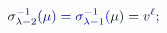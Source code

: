 \documentclass[12pt]{article}
\begin{document}
\makeatletter
\renewcommand*{\@textcolor}[3]{%
  \protect\leavevmode
  \begingroup
    \color#1{#2}#3%
  \endgroup
}
\makeatother
\begin{displaymath}
\mathcolor[RGB]{0,0,15}{\sigma} _ { \mathcolor[RGB]{0,0,30}{\lambda} \mathcolor[RGB]{0,0,45}{-} \mathcolor[RGB]{0,0,60}{2} } ^ { \mathcolor[RGB]{0,0,75}{-} \mathcolor[RGB]{0,0,90}{1} } \mathcolor[RGB]{0,0,105}{(} \mathcolor[RGB]{0,0,120}{\mu} \mathcolor[RGB]{0,0,135}{)} \mathcolor[RGB]{0,0,150}{=} \mathcolor[RGB]{0,0,165}{\sigma} _ { \mathcolor[RGB]{0,0,180}{\lambda} \mathcolor[RGB]{0,0,195}{-} \mathcolor[RGB]{0,0,210}{1} } ^ { \mathcolor[RGB]{0,0,225}{-} \mathcolor[RGB]{0,0,240}{1} } \mathcolor[RGB]{0,0,255}{(} \mathcolor[RGB]{0,15,0}{\mu} \mathcolor[RGB]{0,15,15}{)} \mathcolor[RGB]{0,15,30}{=} \mathcolor[RGB]{0,15,45}{v} ^ { \mathcolor[RGB]{0,15,60}{\ell} } \mathcolor[RGB]{0,15,75}{;}
\end{displaymath}
\end{document}
